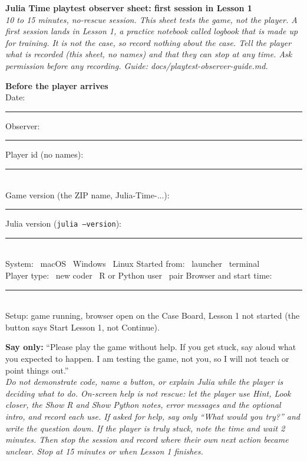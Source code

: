 \documentclass[10pt]{article}
\newcommand{\checkbox}{\fbox{\rule{0pt}{0.75em}\rule{0.75em}{0pt}}}
\begin{document}
\small

{\Large\bfseries Julia Time playtest observer sheet: first session in Lesson 1}\\[-2pt]
\textit{10 to 15 minutes, no-rescue session. This sheet tests the game, not the player. A first session lands in Lesson 1, a practice notebook called logbook that is made up for training. It is not the case, so record nothing about the case. Tell the player what is recorded (this sheet, no names) and that they can stop at any time. Ask permission before any recording. Guide: docs/playtest-observer-guide.md.}

\vspace{3pt}
\textbf{Before the player arrives}\\
Date: \rule{0.14\linewidth}{0.3pt}\quad Observer: \rule{0.20\linewidth}{0.3pt}\quad Player id (no names): \rule{0.20\linewidth}{0.3pt}\\
Game version (the ZIP name, Julia-Time-...): \rule{0.22\linewidth}{0.3pt}\quad Julia version (\texttt{julia --version}): \rule{0.15\linewidth}{0.3pt}\\
System: \checkbox\ macOS \quad \checkbox\ Windows \quad \checkbox\ Linux \qquad Started from: \checkbox\ launcher \quad \checkbox\ terminal\\
Player type: \checkbox\ new coder \quad \checkbox\ R or Python user \quad \checkbox\ pair \qquad Browser and start time: \rule{0.25\linewidth}{0.3pt}\\
Setup: game running, browser open on the Case Board, Lesson 1 not started (the button says Start Lesson 1, not Continue).

\vspace{3pt}
\textbf{Say only:} ``Please play the game without help. If you get stuck, say aloud what you expected to happen. I am testing the game, not you, so I will not teach or point things out.''\\
\textit{Do not demonstrate code, name a button, or explain Julia while the player is deciding what to do. On-screen help is not rescue: let the player use Hint, Look closer, the Show R and Show Python notes, error messages and the optional intro, and record each use. If asked for help, say only ``What would you try?'' and write the question down. If the player is truly stuck, note the time and wait 2 minutes. Then stop the session and record where their own next action became unclear. Stop at 15 minutes or when Lesson 1 finishes.}
\end{document}
